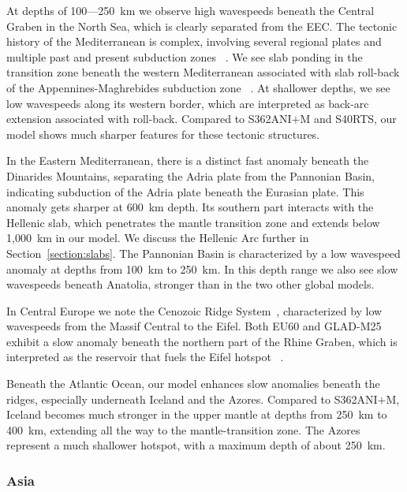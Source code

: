At depths of 100---250~km we observe high wavespeeds beneath the Central Graben
in the North Sea, which is clearly separated from the EEC.
The tectonic history of the Mediterranean is complex,
involving several regional plates and multiple past and present subduction zones
~\cite{dewey1989kinematics}.
We see slab ponding in the transition zone beneath the western Mediterranean
associated with slab roll-back of the Appennines-Maghrebides subduction zone
~\cite{wortel2000subduction, zhu2012structure}.
At shallower depths, we see low wavespeeds along its western border,
which are interpreted as back-arc extension associated with  roll-back.
Compared to S362ANI$+$M and S40RTS,
our model shows much sharper features for these tectonic structures.

In the Eastern Mediterranean, there is a distinct fast anomaly beneath the 
Dinarides Mountains, separating the Adria plate from the Pannonian Basin,
indicating subduction of the Adria plate beneath the Eurasian plate.
This anomaly gets sharper at 600~km depth.
Its southern part interacts with the Hellenic slab, which penetrates the mantle
transition zone and extends below 1,000~km in our model.
We discuss the Hellenic Arc further in Section~\ref{section:slabs}.
The Pannonian Basin is characterized by a low wavespeed
anomaly at depths from 100~km to 250~km.
In this depth range we also see slow wavespeeds beneath Anatolia,
stronger than in the two other global models.

In Central Europe we note the Cenozoic Ridge System~\cite{ziegler1992european},
characterized by low 
wavespeeds from the Massif Central to the Eifel. Both EU60 and
GLAD-M25 exhibit a slow anomaly beneath the northern part of the Rhine Graben,
which is interpreted as the reservoir that fuels the Eifel hotspot
~\cite{goes1999lower, zhu2015seismic}.

Beneath the Atlantic Ocean, our model enhances slow anomalies beneath the
ridges, especially underneath Iceland and the Azores.
Compared to S362ANI$+$M, Iceland becomes much stronger in the upper mantle at
depths from 250~km to 400~km, extending all the way to the mantle-transition zone.
The Azores represent a much shallower hotspot, with a maximum depth of about 250~km.

\subsubsection{Asia}

